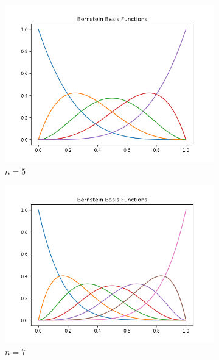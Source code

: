 \documentclass[12pt,letterpaper]{article}
\begin{document}
\begin{figure}[H]
    \begin{center}
        \caption{Bernstein basis function graphs, generated by listing \ref{lst:bern}.}
        \begin{subfigure}[b]{.3\linewidth}
            \includegraphics[width=\linewidth]{bern5}
            \caption{$n=5$}
        \end{subfigure}
        \begin{subfigure}[b]{.3\linewidth}
            \includegraphics[width=\linewidth]{bern7}
            \caption{$n=7$}
        \end{subfigure}
        \begin{subfigure}[b]{.3\linewidth}

\end{subfigure}
\end{center}
\end{figure}
\end{document}
